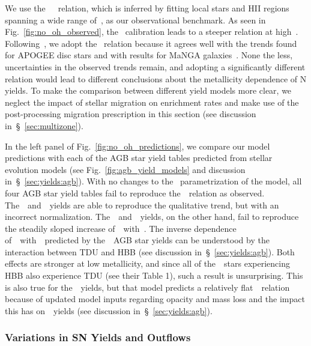 \documentclass[ms.tex]{subfiles}
\begin{document}
We use the~\citet{Dopita2016}~\ohno~relation, which is inferred by fitting
local stars and HII regions spanning a wide range of~\oh, as our observational
benchmark.
As seen in Fig.~\ref{fig:no_oh_observed}, the~\citet{Pilyugin2010} calibration
leads to a steeper relation at high~\oh.
Following~\citet{Vincenzo2021}, we adopt the~\citet{Dopita2016} relation
because it agrees well with the trends found for APOGEE disc stars and with
results for MaNGA galaxies~\citep[][see
Fig.~\ref{fig:no_oh_observed}]{Belfiore2017}.
None the less, uncertainties in the observed trends remain, and adopting a
significantly different relation would lead to different conclusions about the
metallicity dependence of N yields.
To make the comparison between different yield models more clear, we neglect
the impact of stellar migration on enrichment rates and make use of the
post-processing migration prescription in this section (see discussion
in~\S~\ref{sec:multizone}).
\par
In the left panel of Fig.~\ref{fig:no_oh_predictions}, we compare our model
predictions with each of the AGB star yield tables predicted from stellar
evolution models (see Fig.~\ref{fig:agb_yield_models} and discussion
in~\S~\ref{sec:yields:agb}).
With no changes to the~\citet{Johnson2021} parametrization of the model, all
four AGB star yield tables fail to reproduce the~\ohno~relation as observed.
The~\cristallo~and~\ventura~yields are able to reproduce the qualitative trend,
but with an incorrect normalization.
The~\karakasten~and~\karakas~yields, on the other hand, fail to reproduce
the steadily sloped increase of~\no~with~\oh.
The inverse dependence of~\no~with~\oh~predicted by the~\karakasten~AGB star
yields can be understood by the interaction between TDU and HBB (see discussion
in~\S~\ref{sec:yields:agb}).
Both effects are stronger at low metallicity, and since all of
the~\karakasten~stars experiencing HBB also experience TDU (see their Table 1),
such a result is unsurprising.
This is also true for the~\karakas~yields, but that model predicts a
relatively flat~\ohno~relation because of updated model inputs regarding
opacity and mass loss and the impact this has on~\Nfourteen~yields (see
discussion in~\S~\ref{sec:yields:agb}).

\subsubsection{Variations in SN Yields and Outflows}
\label{sec:results:yields:variations}
\end{document}
